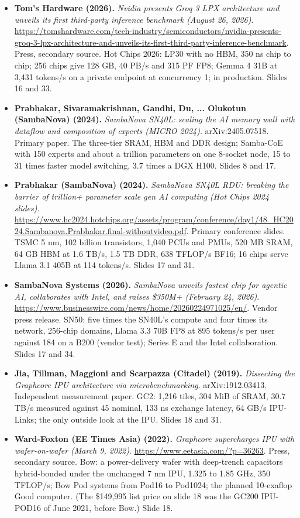 \begin{itemize}[leftmargin=1.2em,itemsep=3pt]
\item \textbf{Tom's Hardware (2026).} \textit{Nvidia presents Groq 3 LPX architecture and unveils its first third-party inference benchmark (August 26, 2026)}. \url{https://tomshardware.com/tech-industry/semiconductors/nvidia-presents-groq-3-lpx-architecture-and-unveils-its-first-third-party-inference-benchmark}. Press, secondary source. Hot Chips 2026: LP30 with no HBM, 350 ns chip to chip; 256 chips give 128 GB, 40 PB/s and 315 PF FP8; Gemma 4 31B at 3,431 tokens/s on a private endpoint at concurrency 1; in production. Slides 16 and 33.
\item \textbf{Prabhakar, Sivaramakrishnan, Gandhi, Du, ... Olukotun (SambaNova) (2024).} \textit{SambaNova SN40L: scaling the AI memory wall with dataflow and composition of experts (MICRO 2024)}. arXiv:2405.07518. Primary paper. The three-tier SRAM, HBM and DDR design; Samba-CoE with 150 experts and about a trillion parameters on one 8-socket node, 15 to 31 times faster model switching, 3.7 times a DGX H100. Slides 8 and 17.
\item \textbf{Prabhakar (SambaNova) (2024).} \textit{SambaNova SN40L RDU: breaking the barrier of trillion+ parameter scale gen AI computing (Hot Chips 2024 slides)}. \url{https://www.hc2024.hotchips.org/assets/program/conference/day1/48_HC2024.Sambanova.Prabhakar.final-withoutvideo.pdf}. Primary conference slides. TSMC 5 nm, 102 billion transistors, 1,040 PCUs and PMUs, 520 MB SRAM, 64 GB HBM at 1.6 TB/s, 1.5 TB DDR, 638 TFLOP/s BF16; 16 chips serve Llama 3.1 405B at 114 tokens/s. Slides 17 and 31.
\item \textbf{SambaNova Systems (2026).} \textit{SambaNova unveils fastest chip for agentic AI, collaborates with Intel, and raises \$350M+ (February 24, 2026)}. \url{https://www.businesswire.com/news/home/20260224971025/en/}. Vendor press release. SN50: five times the SN40L's compute and four times its network, 256-chip domains, Llama 3.3 70B FP8 at 895 tokens/s per user against 184 on a B200 (vendor test); Series E and the Intel collaboration. Slides 17 and 34.
\item \textbf{Jia, Tillman, Maggioni and Scarpazza (Citadel) (2019).} \textit{Dissecting the Graphcore IPU architecture via microbenchmarking}. arXiv:1912.03413. Independent measurement paper. GC2: 1,216 tiles, 304 MiB of SRAM, 30.7 TB/s measured against 45 nominal, 133 ns exchange latency, 64 GB/s IPU-Links; the only outside look at the IPU. Slides 18 and 31.
\item \textbf{Ward-Foxton (EE Times Asia) (2022).} \textit{Graphcore supercharges IPU with wafer-on-wafer (March 9, 2022)}. \url{https://www.eetasia.com/?p=36263}. Press, secondary source. Bow: a power-delivery wafer with deep-trench capacitors hybrid-bonded under the unchanged 7 nm IPU, 1.325 to 1.85 GHz, 350 TFLOP/s; Bow Pod systems from Pod16 to Pod1024; the planned 10-exaflop Good computer. (The \$149,995 list price on slide 18 was the GC200 IPU-POD16 of June 2021, before Bow.) Slide 18.

\end{itemize}
